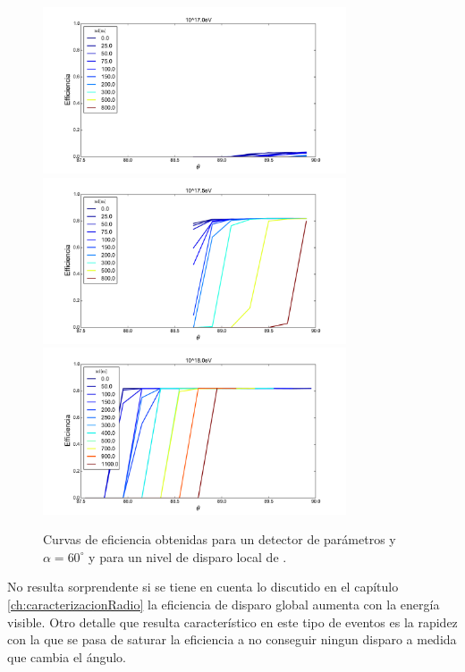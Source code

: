 	\begin{figure}[ht!]
		\begin{center}
				\includegraphics[width=0.8\textwidth]{fig/resultadosRadio/eff75_0_4_0_1500_0_1500_0_60_0_1_0_17_0_m2.pdf} 
				\includegraphics[width=0.8\textwidth]{fig/resultadosRadio/eff75_0_4_0_1500_0_1500_0_60_0_1_0_17_5_m2.pdf}
				\includegraphics[width=0.8\textwidth]{fig/resultadosRadio/eff75_0_4_0_1500_0_1500_0_60_0_1_0_18_0_m2.pdf}
			\caption{Curvas de eficiencia obtenidas para un detector de par\'ametros  y $\alpha=60^\circ$ y para un nivel de disparo local de .}
			\label{fig:effRadio}
		\end{center}
	\end{figure}
	No resulta sorprendente si se tiene en cuenta lo discutido en el cap\'itulo \ref{ch:caracterizacionRadio} la eficiencia de disparo global aumenta con la energ\'ia visible.
	Otro detalle que resulta caracter\'istico en este tipo de eventos es la rapidez con la que se pasa de saturar la eficiencia a no conseguir ningun disparo a medida que cambia el \'angulo.
	

